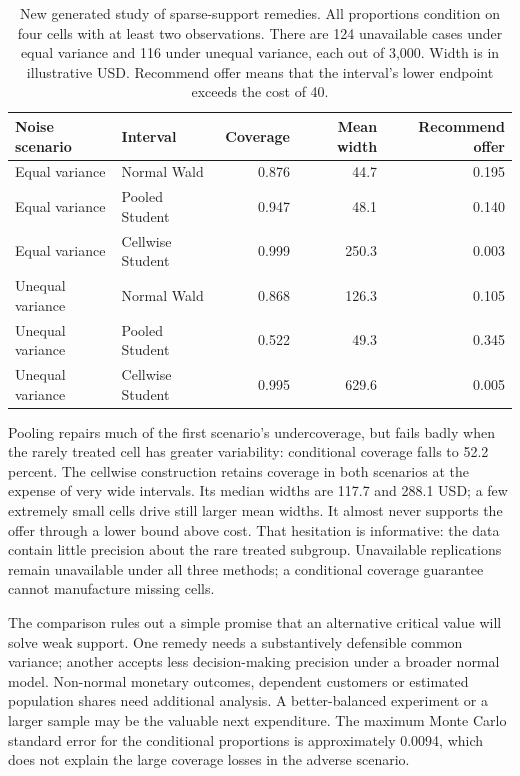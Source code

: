 \begin{table}[htbp]\centering\small
\begin{tabular}{llrrr}
\toprule
Noise scenario & Interval & Coverage & Mean width & Recommend offer \\
\midrule
Equal variance & Normal Wald & 0.876 & 44.7 & 0.195 \\
Equal variance & Pooled Student & 0.947 & 48.1 & 0.140 \\
Equal variance & Cellwise Student & 0.999 & 250.3 & 0.003 \\
Unequal variance & Normal Wald & 0.868 & 126.3 & 0.105 \\
Unequal variance & Pooled Student & 0.522 & 49.3 & 0.345 \\
Unequal variance & Cellwise Student & 0.995 & 629.6 & 0.005 \\
\bottomrule
\end{tabular}
\caption{New generated study of sparse-support remedies. All proportions
condition on four cells with at least two observations. There are 124
unavailable cases under equal variance and 116 under unequal variance, each
out of 3,000. Width is in illustrative USD. Recommend offer means that the
interval's lower endpoint exceeds the cost of 40.}
\label{scisyn:interval-remedies}
\end{table}

Pooling repairs much of the first scenario's undercoverage, but fails badly
when the rarely treated cell has greater variability: conditional coverage
falls to 52.2 percent. The cellwise construction retains coverage in both
scenarios at the expense of very wide intervals. Its median widths are 117.7
and 288.1 USD; a few extremely small cells drive still larger mean widths.
It almost never supports the offer through a lower bound above cost. That
hesitation is informative: the data contain little precision about the rare
treated subgroup. Unavailable replications remain unavailable under all three
methods; a conditional coverage guarantee cannot manufacture missing cells.

The comparison rules out a simple promise that an alternative critical value
will solve weak support. One remedy needs a substantively defensible common
variance; another accepts less decision-making precision under a broader
normal model. Non-normal monetary outcomes, dependent customers or estimated
population shares need additional analysis. A better-balanced experiment or a
larger sample may be the valuable next expenditure. The maximum Monte Carlo
standard error for the conditional proportions is approximately 0.0094, which
does not explain the large coverage losses in the adverse scenario.

